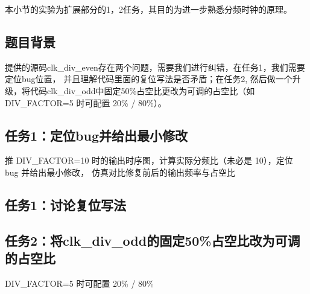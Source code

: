 
本小节的实验为扩展部分的1，2任务，其目的为进一步熟悉分频时钟的原理。

\subsection{题目背景}
提供的源码clk\_div\_even存在两个问题，需要我们进行纠错，在任务1，我们需要定位bug位置，
并且理解代码里面的复位写法是否矛盾；在任务2,
然后做一个升级，将代码clk\_div\_odd中固定50\%占空比更改为可调的占空比（如DIV\_FACTOR=5 时可配置 20\% / 80\%）。

\subsection{任务1：定位bug并给出最小修改}
推 DIV\_FACTOR=10 时的输出时序图，计算实际分频比（未必是 10），定位 bug 并给出最小修改，
仿真对比修复前后的输出频率与占空比

\subsection{任务1：讨论复位写法}

\subsection{任务2：将clk\_div\_odd的固定50\%占空比改为可调的占空比}


DIV\_FACTOR=5 时可配置 20\% / 80\%
